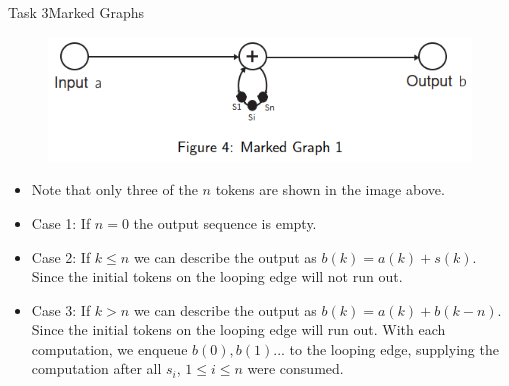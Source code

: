 \begin{frame}{Task 3}{Marked Graphs}
    \begin{solutionnoinc}
        \begin{figure}
            \centering
            \includegraphics[scale=0.35]{figures/markedGraph2.png}
        \end{figure}
        \begin{itemize}
            \item Note that only three of the $n$ tokens are shown in the image above.
            \item Case 1: If $n = 0$ the output sequence is empty.
            \item Case 2: If $k \leq n$ we can describe the output as $b(k) = a(k) + s(k)$. Since the initial tokens on the looping edge will not run out.
            \item Case 3: If $k > n$ we can describe the output as $b(k) = a(k) + b(k-n)$. Since the initial tokens on the looping edge will run out. With each computation, we enqueue $b(0), b(1)...$ to the looping edge, supplying the computation after all $s_i$, $1 \leq i \leq n$ were consumed.
        \end{itemize}
    \end{solutionnoinc}
\end{frame}
